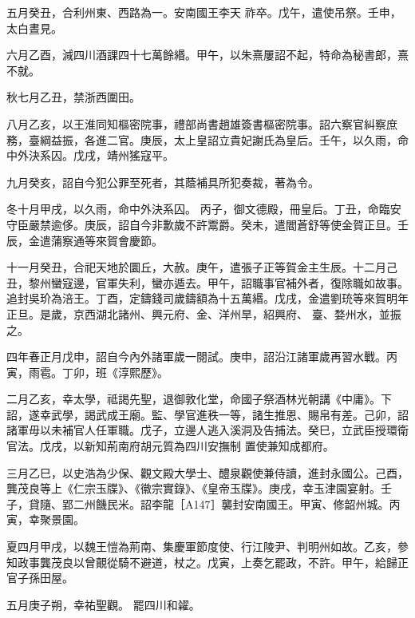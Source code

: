 \begin{pinyinscope}
 五月癸丑，合利州東、西路為一。安南國王李天
 祚卒。戊午，遣使吊祭。壬申，太白晝見。



 六月乙酉，減四川酒課四十七萬餘緡。甲午，以朱熹屢詔不起，特命為秘書郎，熹不就。



 秋七月乙丑，禁浙西圍田。



 八月乙亥，以王淮同知樞密院事，禮部尚書趙雄簽書樞密院事。詔六察官糾察庶務，臺綱益振，各進二官。庚辰，太上皇詔立貴妃謝氏為皇后。壬午，以久雨，命中外決系囚。戊戌，靖州猺寇平。



 九月癸亥，詔自今犯公罪至死者，其蔭補具所犯奏裁，著為令。



 冬十月甲戌，以久雨，命中外決系囚。
 丙子，御文德殿，冊皇后。丁丑，命臨安守臣嚴禁逾侈。庚辰，詔自今非歉歲不許鬻爵。癸未，遣閻蒼舒等使金賀正旦。壬辰，金遣蒲察通等來賀會慶節。



 十一月癸丑，合祀天地於圜丘，大赦。庚午，遣張子正等賀金主生辰。十二月己丑，黎州蠻寇邊，官軍失利，蠻亦遁去。甲午，詔職事官補外者，復除職如故事。追封吳玠為涪王。丁酉，定鑄錢司歲鑄額為十五萬緡。戊戌，金遣劉珫等來賀明年正旦。是歲，京西湖北諸州、興元府、金、洋州旱，紹興府、
 臺、婺州水，並振之。



 四年春正月戊申，詔自今內外諸軍歲一閱試。庚申，詔沿江諸軍歲再習水戰。丙寅，雨雹。丁卯，班《淳熙歷》。



 二月乙亥，幸太學，祗謁先聖，退御敦化堂，命國子祭酒林光朝講《中庸》。下詔，遂幸武學，謁武成王廟。監、學官進秩一等，諸生推恩、賜帛有差。己卯，詔諸軍毋以未補官人任軍職。戊子，立邊人逃入溪洞及告捕法。癸巳，立武臣授環衛官法。戊戌，以新知荊南府胡元質為四川安撫制
 置使兼知成都府。



 三月乙巳，以史浩為少保、觀文殿大學士、醴泉觀使兼侍讀，進封永國公。己酉，龔茂良等上《仁宗玉牒》、《徽宗實錄》、《皇帝玉牒》。庚戌，幸玉津園宴射。壬子，貸隨、郢二州饑民米。詔李龍［A147］襲封安南國王。甲寅、修韶州城。丙寅，幸聚景園。



 夏四月甲戌，以魏王愷為荊南、集慶軍節度使、行江陵尹、判明州如故。乙亥，參知政事龔茂良以曾覿從騎不避道，杖之。戊寅，上奏乞罷政，不許。甲午，給歸正官子孫田屋。



 五月庚子朔，幸祐聖觀。
 罷四川和糴。




\end{pinyinscope}

